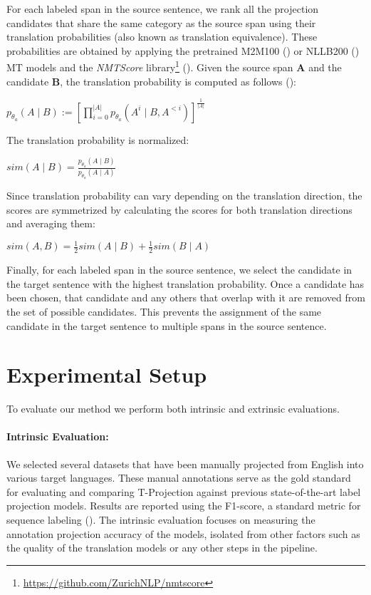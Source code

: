 For each labeled span in the source sentence, we rank all the projection candidates that share the same category as the source span using their translation probabilities (also known as translation equivalence). These probabilities are obtained by applying the pretrained M2M100 (\cite{JMLR:v22:20-1307}) or NLLB200 (\cite{DBLP:journals/corr/abs-2207-04672}) MT models and the \textit{NMTScore} library\footnote{\url{https://github.com/ZurichNLP/nmtscore}} (\cite{DBLP:journals/corr/abs-2204-13692}). Given the source span $\mathbf{A}$ and the candidate $\mathbf{B}$, the translation probability is computed as follows (\cite{DBLP:journals/corr/abs-2204-13692}):

\begin{center}
$p_{\theta_a}(A \mid B):=\left[\prod_{i=0}^{|A|} p_{\theta_a}\left(A^i \mid B, A^{<i}\right)\right]^{\frac{1}{|A|}}$
\end{center}

\noindent The translation probability is normalized:

\begin{center}
$sim(A \mid B) = \frac{p_{\theta_a}(A \mid B)}{p_{\theta_a}(A \mid A)}$
\end{center}

Since translation probability can vary depending on the translation direction, the scores are symmetrized by calculating the scores for both translation directions and averaging them:

\begin{center}
$sim(A, B)=\frac{1}{2} sim(A \mid B)+\frac{1}{2} sim(B \mid A)$
\end{center}

Finally, for each labeled span in the source sentence, we select the candidate in the target sentence with the highest translation probability. Once a candidate has been chosen, that candidate and any others that overlap with it are removed from the set of possible candidates. This prevents the assignment of the same candidate in the target sentence to multiple spans in the source sentence.


\section{Experimental Setup}\label{sec5:Methodology}

To evaluate our method we perform both intrinsic and extrinsic evaluations.



\paragraph{Intrinsic Evaluation:} We selected several datasets that have been manually projected from English into various target languages. These manual annotations serve as the gold standard for evaluating and comparing T-Projection against previous state-of-the-art label projection models. Results are reported using the F1-score, a standard metric for sequence labeling (\cite{DBLP:conf/conll/Sang02}). The intrinsic evaluation focuses on measuring the annotation projection accuracy of the models, isolated from other factors such as the quality of the translation models or any other steps in the pipeline.

